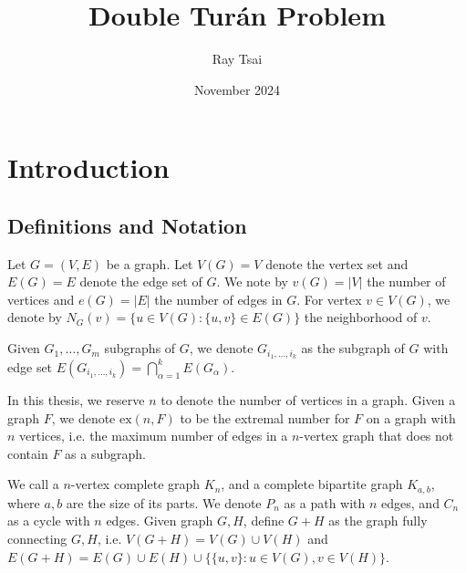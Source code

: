 \documentclass[12pt]{report}
\title{Double Turán Problem}
\author{Ray Tsai}
\date{November 2024}
\begin{document}
\maketitle



\tableofcontents

\chapter{Introduction}

\section{Definitions and Notation}
Let $G = (V, E)$ be a graph. Let $V(G) = V$ denote the vertex set and $E(G) = E$ denote the edge set
of $G$. We note by $v(G) = |V|$ the number of vertices and $e(G) = |E|$ the number of edges in $G$.
For vertex $v \in V(G)$, we denote by $N_G(v) = \{u \in V(G) : \{u, v\} \in E(G)\}$ the neighborhood
of $v$.

Given $G_1, \ldots, G_m$ subgraphs of $G$, we denote $G_{i_1, \ldots, i_k}$ as the subgraph of $G$
with edge set $E(G_{i_1, \ldots, i_k}) = \bigcap_{\alpha = 1}^k E(G_{\alpha})$. 

In this thesis, we reserve $n$ to denote the number of vertices in a graph. Given a graph $F$, we
denote $\text{ex}(n, F)$ to be the extremal number for $F$ on a graph with $n$ vertices, i.e. the
maximum number of edges in a $n$-vertex graph that does not contain $F$ as a subgraph.

We call a $n$-vertex complete graph $K_n$, and a complete bipartite graph $K_{a, b}$, where $a, b$
are the size of its parts. We denote $P_n$ as a path with $n$ edges, and $C_n$ as a cycle with
$n$ edges. Given graph $G, H$, define $G + H$ as the graph fully connecting $G, H$, i.e. $V(G + H) =
V(G) \cup V(H)$ and $E(G + H) = E(G) \cup E(H) \cup \{\{u, v\} : u \in V(G), v \in V(H)\}$.
\end{document}
